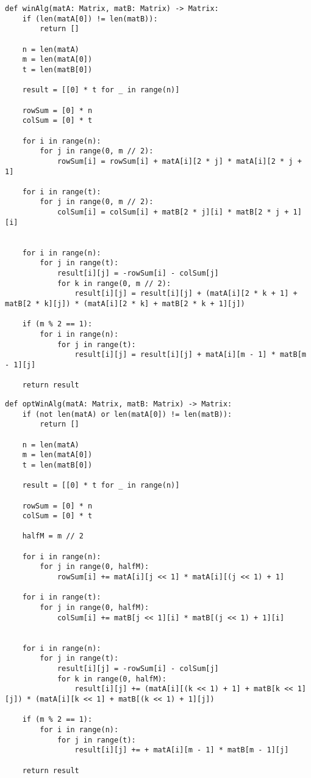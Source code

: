 \begin{center}
    \captionsetup{justification=raggedright,singlelinecheck=off}
    \begin{lstlisting}[label=lst:vin_alg,caption=Реализация алгоритма Винограда умножения матриц]
def winAlg(matA: Matrix, matB: Matrix) -> Matrix:
	if (len(matA[0]) != len(matB)):
		return []
	
	n = len(matA)
	m = len(matA[0])
	t = len(matB[0])
	
	result = [[0] * t for _ in range(n)]
	
	rowSum = [0] * n
	colSum = [0] * t
	
	for i in range(n):
		for j in range(0, m // 2):
			rowSum[i] = rowSum[i] + matA[i][2 * j] * matA[i][2 * j + 1]
			
	for i in range(t):
		for j in range(0, m // 2):
			colSum[i] = colSum[i] + matB[2 * j][i] * matB[2 * j + 1][i]
	
	
	for i in range(n):
		for j in range(t):
			result[i][j] = -rowSum[i] - colSum[j]
			for k in range(0, m // 2):
				result[i][j] = result[i][j] + (matA[i][2 * k + 1] + matB[2 * k][j]) * (matA[i][2 * k] + matB[2 * k + 1][j])
	
	if (m % 2 == 1):
		for i in range(n):
			for j in range(t):
				result[i][j] = result[i][j] + matA[i][m - 1] * matB[m - 1][j]
	
	return result
\end{lstlisting}
\end{center}


\begin{center}
    \captionsetup{justification=raggedright,singlelinecheck=off}
    \begin{lstlisting}[label=lst:opt_vin_alg,caption=Реализация оптимизированного алгоритма Винограда умножения матриц]
def optWinAlg(matA: Matrix, matB: Matrix) -> Matrix:
	if (not len(matA) or len(matA[0]) != len(matB)):
		return []
	
	n = len(matA)
	m = len(matA[0])
	t = len(matB[0])
	
	result = [[0] * t for _ in range(n)]
	
	rowSum = [0] * n
	colSum = [0] * t
	
	halfM = m // 2
	
	for i in range(n):
		for j in range(0, halfM):
			rowSum[i] += matA[i][j << 1] * matA[i][(j << 1) + 1]
			
	for i in range(t):
		for j in range(0, halfM):
			colSum[i] += matB[j << 1][i] * matB[(j << 1) + 1][i]
	
	
	for i in range(n):
		for j in range(t):
			result[i][j] = -rowSum[i] - colSum[j]
			for k in range(0, halfM):
				result[i][j] += (matA[i][(k << 1) + 1] + matB[k << 1][j]) * (matA[i][k << 1] + matB[(k << 1) + 1][j])
	
	if (m % 2 == 1):
		for i in range(n):
			for j in range(t):
				result[i][j] += + matA[i][m - 1] * matB[m - 1][j]
	
	return result
\end{lstlisting}
\end{center}



